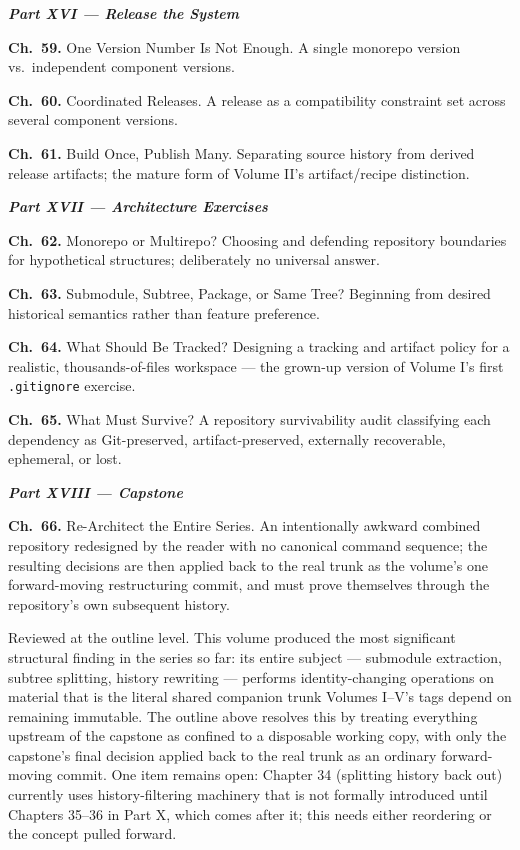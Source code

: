 \documentclass[11pt]{book}
\newcommand{\subheading}[1]{\bigskip\noindent{\bfseries\itshape #1}\smallskip\par}
\newcommand{\chapentry}[2]{\noindent\textbf{Ch.~#1.} #2\par\smallskip}
\newcommand{\partheading}[1]{\bigskip\noindent\textbf{\textit{#1}}\smallskip\par}
\begin{document}
\partheading{Part XVI --- Release the System}
\chapentry{59}{One Version Number Is Not Enough. A single monorepo version vs.\ independent component versions.}
\chapentry{60}{Coordinated Releases. A release as a compatibility constraint set across several component versions.}
\chapentry{61}{Build Once, Publish Many. Separating source history from derived release artifacts; the mature form of Volume II's artifact/recipe distinction.}

\partheading{Part XVII --- Architecture Exercises}
\chapentry{62}{Monorepo or Multirepo? Choosing and defending repository boundaries for hypothetical structures; deliberately no universal answer.}
\chapentry{63}{Submodule, Subtree, Package, or Same Tree? Beginning from desired historical semantics rather than feature preference.}
\chapentry{64}{What Should Be Tracked? Designing a tracking and artifact policy for a realistic, thousands-of-files workspace --- the grown-up version of Volume I's first \texttt{.gitignore} exercise.}
\chapentry{65}{What Must Survive? A repository survivability audit classifying each dependency as Git-preserved, artifact-preserved, externally recoverable, ephemeral, or lost.}

\partheading{Part XVIII --- Capstone}
\chapentry{66}{Re-Architect the Entire Series. An intentionally awkward combined repository redesigned by the reader with no canonical command sequence; the resulting decisions are then applied back to the real trunk as the volume's one forward-moving restructuring commit, and must prove themselves through the repository's own subsequent history.}

\subheading{Status and Open Items}
Reviewed at the outline level. This volume produced the most significant structural finding in the series so far: its entire subject --- submodule extraction, subtree splitting, history rewriting --- performs identity-changing operations on material that is the literal shared companion trunk Volumes I--V's tags depend on remaining immutable. The outline above resolves this by treating everything upstream of the capstone as confined to a disposable working copy, with only the capstone's final decision applied back to the real trunk as an ordinary forward-moving commit. One item remains open: Chapter 34 (splitting history back out) currently uses history-filtering machinery that is not formally introduced until Chapters 35--36 in Part X, which comes after it; this needs either reordering or the concept pulled forward.

\end{document}
